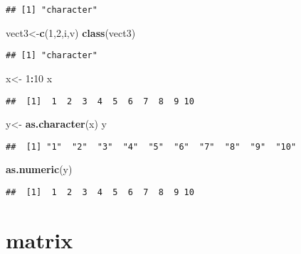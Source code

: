 \documentclass[
]{article}
\newenvironment{Shaded}{\begin{snugshade}}{\end{snugshade}}
\newcommand{\DecValTok}[1]{\textcolor[rgb]{0.00,0.00,0.81}{#1}}
\newcommand{\FunctionTok}[1]{\textcolor[rgb]{0.13,0.29,0.53}{\textbf{#1}}}
\newcommand{\NormalTok}[1]{#1}
\newcommand{\OtherTok}[1]{\textcolor[rgb]{0.56,0.35,0.01}{#1}}
\newcommand{\SpecialCharTok}[1]{\textcolor[rgb]{0.81,0.36,0.00}{\textbf{#1}}}
\newcommand{\StringTok}[1]{\textcolor[rgb]{0.31,0.60,0.02}{#1}}
\begin{document}
\begin{verbatim}
## [1] "character"
\end{verbatim}

\begin{Shaded}
\begin{Highlighting}[]
\NormalTok{vect3}\OtherTok{\textless{}{-}}\FunctionTok{c}\NormalTok{(}\DecValTok{1}\NormalTok{,}\DecValTok{2}\NormalTok{,}\StringTok{\textquotesingle{}i\textquotesingle{}}\NormalTok{,}\StringTok{\textquotesingle{}v\textquotesingle{}}\NormalTok{)}
\FunctionTok{class}\NormalTok{(vect3)}
\end{Highlighting}
\end{Shaded}

\begin{verbatim}
## [1] "character"
\end{verbatim}

\begin{Shaded}
\begin{Highlighting}[]
\NormalTok{x}\OtherTok{\textless{}{-}} \DecValTok{1}\SpecialCharTok{:}\DecValTok{10}
\NormalTok{x}
\end{Highlighting}
\end{Shaded}

\begin{verbatim}
##  [1]  1  2  3  4  5  6  7  8  9 10
\end{verbatim}

\begin{Shaded}
\begin{Highlighting}[]
\NormalTok{y}\OtherTok{\textless{}{-}} \FunctionTok{as.character}\NormalTok{(x)}
\NormalTok{y}
\end{Highlighting}
\end{Shaded}

\begin{verbatim}
##  [1] "1"  "2"  "3"  "4"  "5"  "6"  "7"  "8"  "9"  "10"
\end{verbatim}

\begin{Shaded}
\begin{Highlighting}[]
\FunctionTok{as.numeric}\NormalTok{(y)}
\end{Highlighting}
\end{Shaded}

\begin{verbatim}
##  [1]  1  2  3  4  5  6  7  8  9 10
\end{verbatim}

\hypertarget{matrix}{%
\section{matrix}\label{matrix}}
\end{document}
